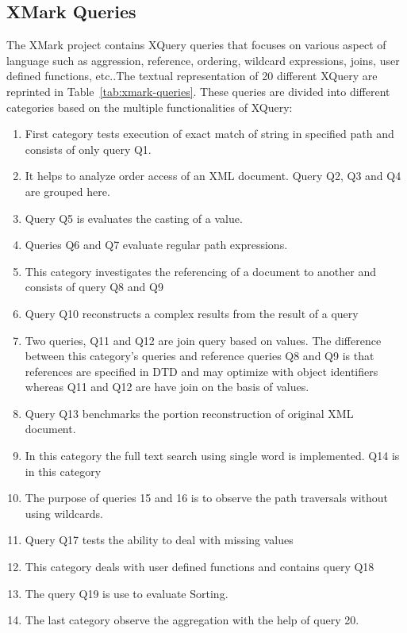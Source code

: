 \subsection{XMark Queries}
The XMark project contains XQuery queries that focuses on various aspect of language such as aggression, reference, ordering, wildcard expressions, joins, user defined functions, etc.\citep{xmark/mlynkova2008xml}.The textual representation of 20 different XQuery are reprinted in  Table~\ref{tab:xmark-queries}. These queries are divided into different categories  based on the  multiple functionalities of XQuery: 
\begin{enumerate}[label=\arabic*.]
\item  First category tests execution of exact match of string in specified path and consists of only query Q1.
\item It  helps to analyze order access of an XML document. Query Q2, Q3 and Q4 are grouped here.
\item  Query Q5 is evaluates the casting of a value.
\item Queries Q6 and Q7  evaluate regular path expressions.

\item This category investigates the referencing of a document to another and consists of query Q8 and Q9

\item Query Q10 reconstructs a complex results from the result of a query

\item Two queries, Q11 and Q12 are join query based on values.  The difference between this category's queries and reference queries Q8 and Q9 is that references are specified in DTD and may optimize with object identifiers whereas Q11 and Q12 are have join on the basis of values.

\item Query Q13  benchmarks the portion reconstruction of original XML document.

\item In this category the full text search  using single word is implemented. Q14 is in this category

\item The purpose of queries 15 and 16 is to observe the path traversals without using wildcards.

\item Query Q17 tests the ability to deal with missing values

\item This category deals with user defined functions and contains query Q18

\item The query Q19 is use to evaluate Sorting.

\item The last category observe the aggregation with the help of query 20.

\end{enumerate}

